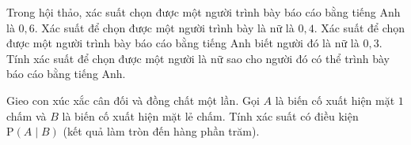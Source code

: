 \begin{bt}%
	Trong hội thảo, xác suất chọn được một người trình bày báo cáo bằng tiếng Anh là $0{,}6$. Xác suất để chọn được một người trình bày là nữ là $0{,}4$. Xác suất để chọn được  một người trình bày báo cáo bằng tiếng Anh biết người đó là nữ là $0{,}3$. Tính xác suất để chọn được một người là nữ sao cho người đó có thể trình bày báo cáo bằng tiếng Anh.
\end{bt}

\begin{bt}%
	Gieo con xúc xắc cân đối và đồng chất một lần. Gọi $A$ là biến  cố xuất hiện mặt $1$ chấm và $B$ là biến cố xuất hiện mặt lẻ chấm. Tính xác suất có điều kiện $\mathrm{P} (A\mid B)$ (kết quả làm tròn đến hàng phần trăm).
\end{bt}

